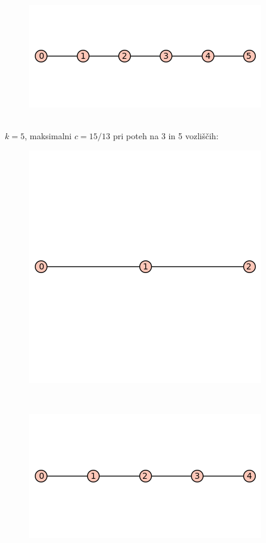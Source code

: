 \documentclass[12pt, a4paper]{article}
\begin{document}
\begin{figure}[h!]
\centering
\includegraphics[width=\linewidth]{6-pot}
\end{figure} \\

$k=5$, maksimalni $c=15/13$ pri poteh na 3 in 5 vozliščih:\\

\begin{figure}[h!]
\centering
\includegraphics[width=\linewidth]{3-pot}
\end{figure} \\

\begin{figure}[h!]
\centering
\includegraphics[width=\linewidth]{5-pot}
\end{figure} \\
\end{document}

